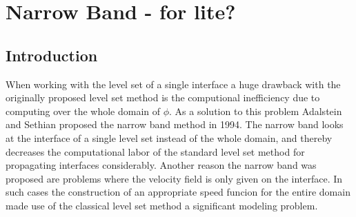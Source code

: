 \section{Narrow Band - for lite?}
\subsection{Introduction}
When working with the level set of a single interface a huge drawback with the originally proposed level set method is the computional inefficiency due to computing over the whole domain of \(\phi\). As a solution to this problem Adalstein and Sethian proposed the narrow band method in 1994\cite{adalsteinsson94}. The narrow band looks at the interface of a single level set instead of the whole domain, and thereby decreases the computational labor of the standard level set method for propagating interfaces considerably. Another reason the narrow band was proposed are problems where the velocity field is only given on the interface. In such cases the construction of an appropriate speed funcion for the entire domain made use of the classical level set method a significant modeling problem.

